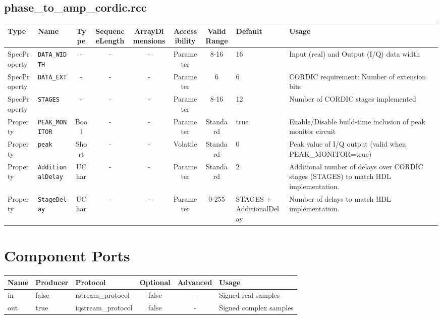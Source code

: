 \documentclass{article}
\def\comp{phase\_to\_amp\_cordic}
\begin{document}
\begin{landscape}
\subsection*{\comp.rcc}
\begin{scriptsize}
	\begin{tabular}{|p{3cm}|p{2cm}|c|c|c|c|c|p{1cm}|p{6cm}|}
		\hline
		\rowcolor{blue}
		Type         & Name              & Type & SequenceLength & ArrayDimensions & Accessibility & Valid Range & Default & Usage                                    \\
		\hline
		SpecProperty & \verb+DATA_WIDTH+ & -    & -              & -               & Parameter     & 8-16        & 16      & Input (real) and Output (I/Q) data width \\
		\hline
		SpecProperty & \verb+DATA_EXT+   & -    & -              & -               & Parameter     & 6           & 6       & CORDIC requirement: Number of extension bits \\
		\hline
		SpecProperty & \verb+STAGES+     & -    & -              & -               & Parameter     & 8-16        & 12      & Number of CORDIC stages implemented      \\
		\hline
		Property & \verb+PEAK_MONITOR+     & Bool    & -              & -               & Parameter     & Standard        & true      & Enable/Disable build-time inclusion of peak monitor circuit\\
		\hline
		Property & \verb+peak+     & Short & -              & -               & Volatile & Standard        & 0 & Peak value of I/Q output (valid when PEAK\_MONITOR=true)\\
		\hline
		Property & \verb+AdditionalDelay+     & UChar & -              & -               & Parameter        & Standard & 2 & Additional number of delays over CORDIC stages (STAGES) to match HDL implementation.\\
		\hline
		Property & \verb+StageDelay+     & UChar & -              & -               & Parameter        & 0-255 & STAGES + AdditionalDelay & Number of delays to match HDL implementation.\\
		\hline
	\end{tabular}
\end{scriptsize}

\section*{Component Ports}
\begin{scriptsize}
	\begin{tabular}{|M{2cm}|M{1.5cm}|M{4cm}|c|c|M{9cm}|}
		\hline
		Name & Producer & Protocol           & Optional & Advanced & Usage                  \\
		\hline
		in   & false    & rstream\_protocol  & false    & -        & Signed real samples    \\
		\hline
		out  & true     & iqstream\_protocol & false    & -        & Signed complex samples \\
		\hline
	\end{tabular}
\end{scriptsize}


\end{landscape}
\end{document}
